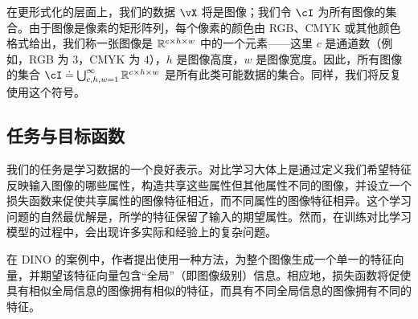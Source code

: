 \documentclass[../../book-main_zh.tex]{subfiles}
\begin{document}
在更形式化的层面上，我们的数据 \(\vX\) 将是图像；我们令 \(\cI\) 为所有图像的集合。由于图像是像素的矩形阵列，每个像素的颜色由 RGB、CMYK 或其他颜色格式给出，我们称一张图像是 \(\mathbb{R}^{c \times h \times w}\) 中的一个元素——这里 \(c\) 是通道数（例如，RGB 为 \(3\)，CMYK 为 \(4\)），\(h\) 是图像高度，\(w\) 是图像宽度。因此，所有图像的集合 \(\cI \doteq \bigcup_{c, h, w = 1}^{\infty}\R^{c \times h \times w}\) 是所有此类可能数据的集合。同样，我们将反复使用这个符号。


\subsection{任务与目标函数} \label{sub:contrastive_learning_objective}

我们的任务是学习数据的一个良好表示。对比学习大体上是通过定义我们希望特征反映输入图像的哪些属性，构造共享这些属性但其他属性不同的图像，并设立一个损失函数来促使共享属性的图像特征相近，而不同属性的图像特征相异。这个学习问题的自然最优解是，所学的特征保留了输入的期望属性。然而，在训练对比学习模型的过程中，会出现许多实际和经验上的复杂问题。

在 DINO 的案例中，作者提出使用一种方法，为整个图像生成一个单一的特征向量，并期望该特征向量包含“全局”（即图像级别）信息。相应地，损失函数将促使具有相似全局信息的图像拥有相似的特征，而具有不同全局信息的图像拥有不同的特征。
\end{document}
